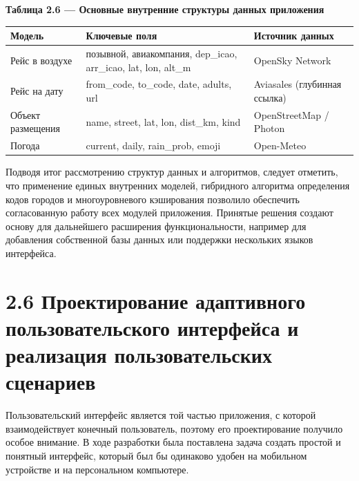 \documentclass[14pt,a4paper,oneside]{extreport}
\begin{document}
\begin{table}[htbp]\centering

\textbf{Таблица 2.6 — Основные внутренние структуры данных приложения}\par\vspace{4pt}

\begin{center}
\small
\begin{tabularx}{\textwidth}{|X|X|X|}
\hline
Модель & Ключевые поля & Источник данных \\
\hline
Рейс в воздухе & позывной, авиакомпания, dep\_icao, arr\_icao, lat, lon, alt\_m & OpenSky Network \\
\hline
Рейс на дату & from\_code, to\_code, date, adults, url & Aviasales (глубинная ссылка) \\
\hline
Объект размещения & name, street, lat, lon, dist\_km, kind & OpenStreetMap / Photon \\
\hline
Погода & current, daily, rain\_prob, emoji & Open-Meteo \\
\hline
\end{tabularx}
\end{center}

\end{table}

Подводя итог рассмотрению структур данных и алгоритмов, следует отметить, что применение единых внутренних моделей, гибридного алгоритма определения кодов городов и многоуровневого кэширования позволило обеспечить согласованную работу всех модулей приложения. Принятые решения создают основу для дальнейшего расширения функциональности, например для добавления собственной базы данных или поддержки нескольких языков интерфейса.


\section*{2.6 Проектирование адаптивного пользовательского интерфейса и реализация пользовательских сценариев}

Пользовательский интерфейс является той частью приложения, с которой взаимодействует конечный пользователь, поэтому его проектирование получило особое внимание. В ходе разработки была поставлена задача создать простой и понятный интерфейс, который был бы одинаково удобен на мобильном устройстве и на персональном компьютере.
\end{document}
